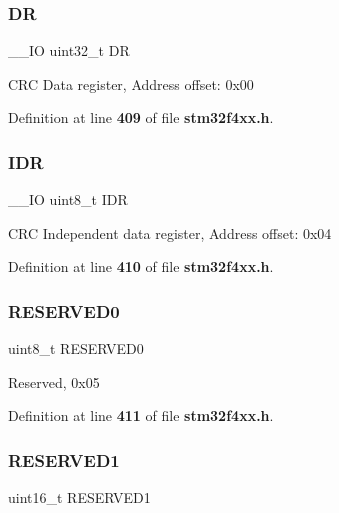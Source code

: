 \mbox{\label{structCRC__TypeDef_a3df0d8dfcd1ec958659ffe21eb64fa94}} 
\subsubsection{DR}
{\footnotesize\ttfamily \+\_\+\+\_\+\+IO uint32\+\_\+t DR}

C\+RC Data register, Address offset\+: 0x00 

Definition at line \textbf{ 409} of file \textbf{ stm32f4xx.\+h}.

\mbox{\label{structCRC__TypeDef_a601d7b0ba761c987db359b2d7173b7e0}} 
\subsubsection{I\+DR}
{\footnotesize\ttfamily \+\_\+\+\_\+\+IO uint8\+\_\+t I\+DR}

C\+RC Independent data register, Address offset\+: 0x04 

Definition at line \textbf{ 410} of file \textbf{ stm32f4xx.\+h}.

\mbox{\label{structCRC__TypeDef_aa7d2bd5481ee985778c410a7e5826b71}} 
\subsubsection{R\+E\+S\+E\+R\+V\+E\+D0}
{\footnotesize\ttfamily uint8\+\_\+t R\+E\+S\+E\+R\+V\+E\+D0}

Reserved, 0x05 

Definition at line \textbf{ 411} of file \textbf{ stm32f4xx.\+h}.

\mbox{\label{structCRC__TypeDef_a8249a3955aace28d92109b391311eb30}} 
\subsubsection{R\+E\+S\+E\+R\+V\+E\+D1}
{\footnotesize\ttfamily uint16\+\_\+t R\+E\+S\+E\+R\+V\+E\+D1}

